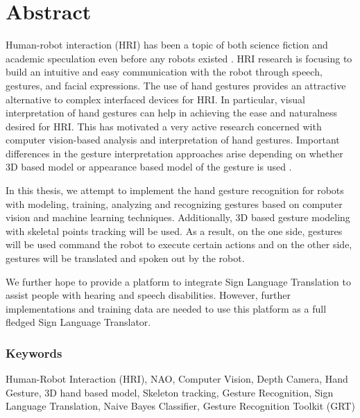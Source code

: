 \chapter*{Abstract}
Human-robot interaction (HRI) has been a topic of both science fiction and academic speculation even before any robots existed \cite{7}. HRI research is focusing to build an intuitive and easy communication with the robot through speech, gestures, and facial expressions. The use of hand gestures provides an attractive alternative to complex interfaced devices for HRI. In particular, visual interpretation of hand gestures can help in achieving the ease and naturalness desired for HRI. This has motivated a very active research concerned with computer vision-based analysis and interpretation of hand gestures. Important differences in the gesture interpretation approaches arise depending on whether 3D based model or appearance based model of the gesture is used \cite{3}. 

In this thesis, we attempt to implement the hand gesture recognition for robots with modeling, training, analyzing and recognizing gestures based on computer vision and machine learning techniques. Additionally, 3D based gesture modeling with skeletal points tracking will be used. As a result, on the one side, gestures will be used command the robot to execute certain actions and on the other side, gestures will be translated and spoken out by the robot.

We further hope to provide a platform to integrate Sign Language Translation to assist people with hearing and speech disabilities. However, further implementations and training data are needed to use this platform as a full fledged Sign Language Translator.

\subsection*{Keywords} Human-Robot Interaction (HRI), NAO, Computer Vision, Depth Camera, Hand Gesture, 3D hand based model, Skeleton tracking, Gesture Recognition, Sign Language Translation, Naive Bayes Classifier, Gesture Recognition Toolkit (GRT)


